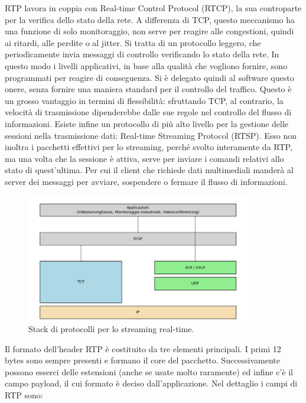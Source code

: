 RTP lavora in coppia con Real-time Control Protocol (RTCP), la sua controparte per la verifica dello stato della rete. A differenza di TCP, questo meccanismo ha una funzione di solo monitoraggio, non serve per reagire alle congestioni, quindi ai ritardi, alle perdite o al jitter. Si tratta di un protocollo leggero, che periodicamente invia messaggi di controllo verificando lo stato della rete. In questo modo i livelli applicativi, in base alla qualità che vogliono fornire, sono programmati per reagire di conseguenza. Si è delegato quindi al software questo onere, senza fornire una maniera standard per il controllo del traffico. Questo è un grosso vantaggio in termini di flessibilità: sfruttando TCP, al contrario, la velocità di trasmissione dipenderebbe dalle sue regole nel controllo del flusso di informazioni. Esiste infine un protocollo di più alto livello per la gestione delle sessioni nella trasmissione dati: Real-time Streaming Protocol (RTSP). Esso non inoltra i pacchetti effettivi per lo streaming, perché svolto interamente da RTP, ma una volta che la sessione è attiva, serve per inviare i comandi relativi allo stato di quest'ultima. Per cui il client che richiede dati multimediali manderà al server dei messaggi per avviare, sospendere o fermare il flusso di informazioni.


\begin{figure}[htbp]
    \centering
    \includegraphics[width=0.9\textwidth]{figures/streaming_stack.png}
    \caption{Stack di protocolli per lo streaming real-time.}
    \label{straming-stack}
\end{figure}

Il formato dell'header RTP è costituito da tre elementi principali. I primi 12 bytes sono sempre presenti e formano il core del pacchetto. Successivamente possono esserci delle estensioni (anche se usate molto raramente) ed infine c'è il campo payload, il cui formato è deciso dall'applicazione. Nel dettaglio i campi di RTP sono:

